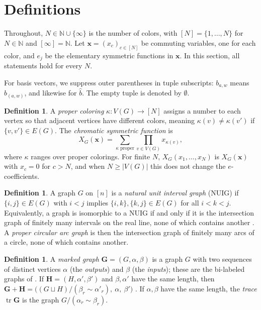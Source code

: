 \documentclass[12pt]{article}
\theoremstyle{plain}
\theoremstyle{definition}
\newtheorem{definition}[theorem]{Definition}
\theoremstyle{remark}
\newcommand{\bN}{\mathbb{N}}
\newcommand{\bG}{\mathbf{G}}
\newcommand{\bH}{\mathbf{H}}
\begin{document}
\section{Definitions}\label{section:defs}

Throughout, $N\in\bN\cup\{\infty\}$ is the number of colors, with $[N]=\{1,\ldots,N\}$ for $N\in\bN$ and $[\infty]=\bN$. Let $\bm x=(x_c)_{c\in[N]}$ be commuting variables, one for each color, and $e_j$ be the elementary symmetric functions in $\bm x$. In this section, all statements hold for every $N$.

For basis vectors, we suppress outer parentheses in tuple subscripts: $b_{a,w}$ means $b_{(a,w)}$, and likewise for $\hat b$. The empty tuple is denoted by $\emptyset$.

\begin{definition}
    A \emph{proper coloring} $\kappa: V(G) \to [N]$ assigns a number to each vertex so that adjacent vertices have different colors, meaning $\kappa(v) \neq \kappa(v')$ if $\{v, v'\}\in E(G)$. The \emph{chromatic symmetric function} \cite[Definition 2.1]{chromsym} is
    \[X_G(\bm x)=\sum_{\kappa \text{ proper}}\prod_{v\in V(G)}x_{\kappa(v)},\]
    where $\kappa$ ranges over proper colorings. For finite $N$, $X_G(x_1,\dots,x_N)$ is $X_G(\bm x)$ with $x_c=0$ for $c>N$, and when $N\ge|V(G)|$ this does not change the $e$-coefficients.
\end{definition}

\begin{definition}
A graph $G$ on $[n]$ is a \emph{natural unit interval graph} (NUIG) if $\{i, j\}\in E(G)$ with $i<j$ implies $\{i,k\}, \{k,j\}\in E(G)$ for all $i<k<j$. Equivalently, a graph is isomorphic to a NUIG if and only if it is the intersection graph of finitely many intervals on the real line, none of which contains another \cite{roberts}. A \emph{proper circular arc graph} is then the intersection graph of finitely many arcs of a circle, none of which contains another.

\end{definition}

\begin{definition}
A \emph{marked graph} $\bG=(G,\alpha,\beta)$ is a graph $G$ with two sequences of distinct vertices $\alpha$ (the \emph{outputs}) and $\beta$ (the \emph{inputs}); these are the bi-labeled graphs of \cite[Definition 3.1]{quantumiso}. If $\bH=(H,\alpha',\beta')$ and $\beta,\alpha'$ have the same length, then $\bG+\bH=\big((G\sqcup H)/(\beta_r\sim\alpha'_r),\ \alpha,\ \beta'\big)$ \cite[Definition 3.13]{quantumiso}. If $\alpha,\beta$ have the same length, the \emph{trace} $\operatorname{tr}\bG$ is the graph $G/(\alpha_r\sim\beta_r)$.
\end{definition}
\end{document}
